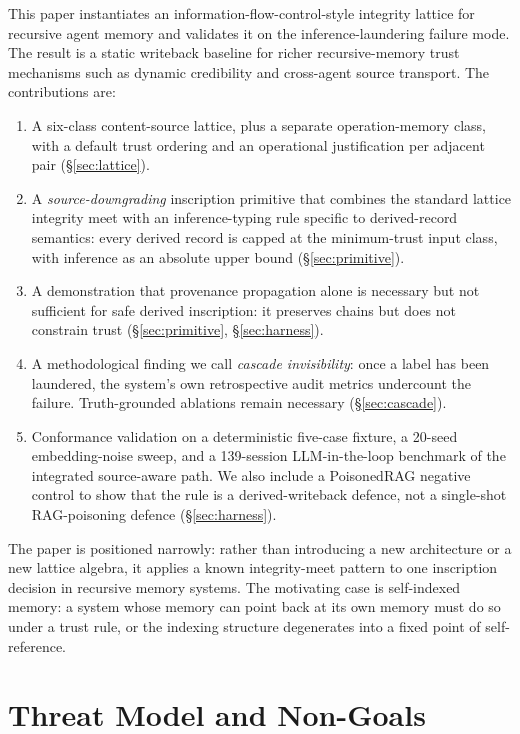 \documentclass[11pt]{article}
\begin{document}
This paper instantiates an information-flow-control-style integrity lattice for recursive agent memory and validates it on the inference-laundering failure mode. The result is a static writeback baseline for richer recursive-memory trust mechanisms such as dynamic credibility and cross-agent source transport. The contributions are:
\begin{enumerate}
\item A six-class content-source lattice, plus a separate operation-memory class, with a default trust ordering and an operational justification per adjacent pair (\S\ref{sec:lattice}).
\item A \emph{source-downgrading} inscription primitive that combines the standard lattice integrity meet with an inference-typing rule specific to derived-record semantics: every derived record is capped at the minimum-trust input class, with inference as an absolute upper bound (\S\ref{sec:primitive}).
\item A demonstration that provenance propagation alone is necessary but not sufficient for safe derived inscription: it preserves chains but does not constrain trust (\S\ref{sec:primitive}, \S\ref{sec:harness}).
\item A methodological finding we call \emph{cascade invisibility}: once a label has been laundered, the system's own retrospective audit metrics undercount the failure. Truth-grounded ablations remain necessary (\S\ref{sec:cascade}).
\item Conformance validation on a deterministic five-case fixture, a 20-seed embedding-noise sweep, and a 139-session LLM-in-the-loop benchmark of the integrated source-aware path. We also include a PoisonedRAG negative control to show that the rule is a derived-writeback defence, not a single-shot RAG-poisoning defence (\S\ref{sec:harness}).
\end{enumerate}

The paper is positioned narrowly: rather than introducing a new architecture or a new lattice algebra, it applies a known integrity-meet pattern to one inscription decision in recursive memory systems. The motivating case is self-indexed memory: a system whose memory can point back at its own memory must do so under a trust rule, or the indexing structure degenerates into a fixed point of self-reference.

\section{Threat Model and Non-Goals}
\label{sec:threat}
\end{document}
